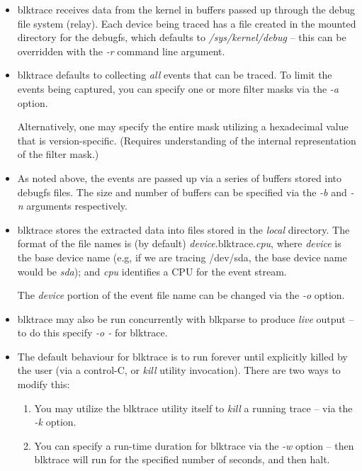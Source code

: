 \documentclass{article}
\begin{document}
\begin{itemize}
  \item blktrace receives data from the kernel in buffers passed up
  through the debug file system (relay). Each device being traced has
  a file created in the mounted directory for the debugfs, which defaults
  to \emph{/sys/kernel/debug} -- this can be overridden with the \emph{-r}
  command line argument.
  
  \item blktrace defaults to collecting \emph{all} events that can be
  traced. To limit the events being captured, you can specify one or
  more filter masks via the \emph{-a} option.

  Alternatively, one may specify the entire mask utilizing a hexadecimal
  value that is version-specific. (Requires understanding of the internal
  representation of the filter mask.)

  \item As noted above, the events are passed up via a series of buffers
  stored into debugfs files. The size and number of buffers can be
  specified via the \emph{-b} and \emph{-n} arguments respectively.

  \item blktrace stores the extracted data into files stored in the
  \emph{local} directory. The format of the file names is (by default)
  \emph{device}.blktrace.\emph{cpu}, where \emph{device} is the base
  device name (e.g, if we are tracing /dev/sda, the base device name would
  be \emph{sda}); and \emph{cpu} identifies a CPU for the event stream.

  The \emph{device} portion of the event file name can be changed via
  the \emph{-o} option.

  \item blktrace may also be run concurrently with blkparse to produce
  \emph{live} output -- to do this specify \emph{-o -} for blktrace.

  \item The default behaviour for blktrace is to run forever until explicitly killed by the user (via a control-C, or \emph{kill} utility invocation). There are two ways to modify this: 

  \begin{enumerate}
    \item You may utilize the blktrace utility itself to \emph{kill}
    a running trace -- via the \emph{-k} option.

    \item You can specify a run-time duration for blktrace via the
    \emph{-w} option -- then blktrace will run for the specified number
    of seconds, and then halt.
  \end{enumerate}
\end{itemize}
\end{document}
